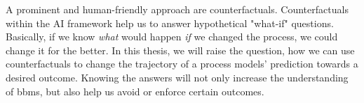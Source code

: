 \documentclass[./../../paper.tex]{subfiles}
\begin{document}
A prominent and human-friendly approach are counterfactuals\needscite{}. Counterfactuals within the AI framework help us to answer hypothetical "what-if" questions. Basically, if we know \emph{what} would happen \emph{if} we changed the process, we could change it for the better. In this thesis, we will raise the question, how we can use counterfactuals to change the trajectory of a process models' prediction towards a desired outcome. Knowing the answers will not only increase the understanding of \glspl{bbm}, but also help us avoid or enforce certain outcomes. 
\end{document}
